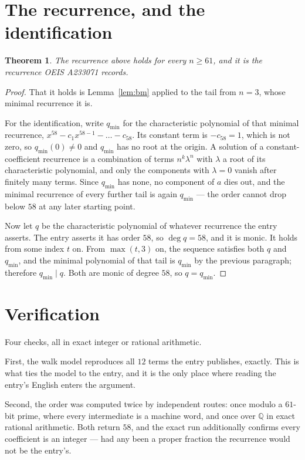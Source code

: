 \documentclass[11pt,a4paper]{article}
\theoremstyle{plain}
\newtheorem{theorem}{Theorem}
\theoremstyle{definition}
\begin{document}
\section{The recurrence, and the identification}

\begin{theorem}
The recurrence above holds for every $n\ge61$, and it is the recurrence OEIS A233071 records.
\end{theorem}

\begin{proof}
That it holds is Lemma~\ref{lem:bm} applied to the tail from $n=3$, whose minimal
recurrence it is.

For the identification, write $q_{\min}$ for the characteristic polynomial of that minimal
recurrence, $x^{58}-c_1x^{58-1}-\dots-c_{58}$. Its constant term is
$-c_{58}=1$, which is not zero, so $q_{\min}(0)\neq0$ and $q_{\min}$ has no
root at the origin. A solution of a constant-coefficient recurrence is a combination of terms
$n^{k}\lambda^{n}$ with $\lambda$ a root of its characteristic polynomial, and only the
components with $\lambda=0$ vanish after finitely many terms. Since $q_{\min}$ has none, no
component of $a$ dies out, and the minimal recurrence of every further tail is again
$q_{\min}$ --- the order cannot drop below $58$ at any later starting point.

Now let $q$ be the characteristic polynomial of whatever recurrence the entry asserts. The
entry asserts it has order $58$, so $\deg q=58$, and it is monic. It holds from some
index $t$ on. From $\max(t,3)$ on, the sequence satisfies both $q$ and $q_{\min}$, and
the minimal polynomial of that tail is $q_{\min}$ by the previous paragraph; therefore
$q_{\min}\mid q$. Both are monic of degree $58$, so $q=q_{\min}$.
\end{proof}

\section{Verification}

Four checks, all in exact integer or rational arithmetic.

First, the walk model reproduces all $12$ terms the entry publishes, exactly. This is
what ties the model to the entry, and it is the only place where reading the entry's English
enters the argument.

Second, the order was computed twice by independent routes: once modulo a $61$-bit prime, where
every intermediate is a machine word, and once over $\mathbb{Q}$ in exact rational arithmetic.
Both return $58$, and the exact run additionally confirms every coefficient is an integer
--- had any been a proper fraction the recurrence would not be the entry's.
\end{document}
